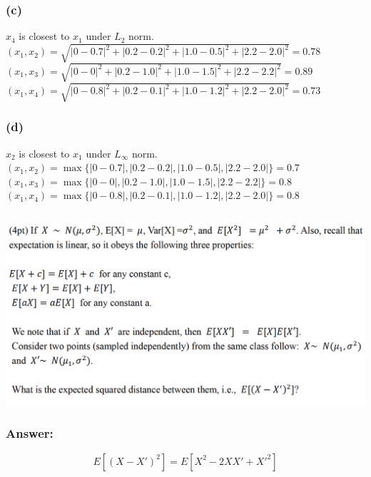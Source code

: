 \documentclass{article}
\begin{document}
\subsubsection*{(c)}
$x_4$ is closest to $x_1$ under $L_2$ norm.
\\
$(x_1,x_2) = \sqrt{|0 - 0.7|^2 + |0.2 - 0.2|^2 + |1.0 - 0.5|^2 + |2.2 - 2.0|^2} = 0.78$
\\
$(x_1,x_3) = \sqrt{|0 - 0|^2 + |0.2 - 1.0|^2 + |1.0 - 1.5|^2 + |2.2 - 2.2|^2} = 0.89$
\\
$(x_1,x_4) = \sqrt{|0 - 0.8|^2 + |0.2 - 0.1|^2 + |1.0 - 1.2|^2 + |2.2 - 2.0|^2} = 0.73$

\subsubsection*{(d)}
$x_2$ is closest to $x_1$ under $L_\infty$ norm.
\\
$(x_1,x_2) = \max\{|0 - 0.7|, |0.2 - 0.2|, |1.0 - 0.5|, |2.2 - 2.0|\} = 0.7$
\\
$(x_1,x_3) = \max\{|0 - 0|, |0.2 - 1.0|, |1.0 - 1.5|, |2.2 - 2.2|\} = 0.8$
\\
$(x_1,x_4) = \max\{|0 - 0.8|, |0.2 - 0.1|, |1.0 - 1.2|, |2.2 - 2.0|\} = 0.8$

\subsection{}
\includegraphics*[scale=.45]{./images/Q1P2.png}

\subsubsection*{Answer:}

\begin{equation}
    E[{(X - X')}^2] = E[X^2 - 2XX' + {X'}^2]
\end{equation}
\end{document}
